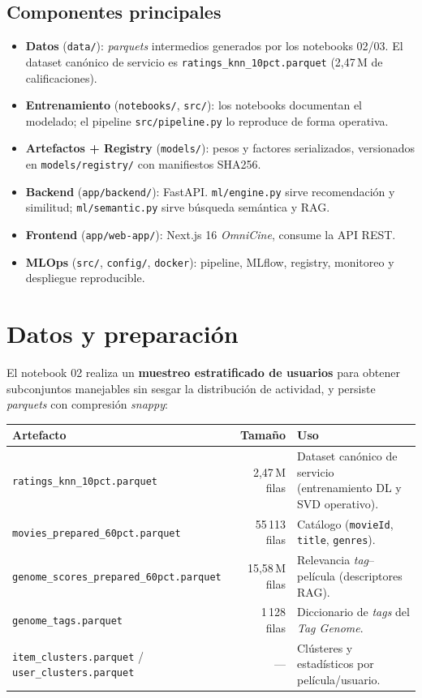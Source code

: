 \documentclass[11pt,a4paper]{article}
\newcommand{\code}[1]{\textcolor{omnidark}{\texttt{#1}}}
\begin{document}
\subsection{Componentes principales}
\begin{itemize}
\item \textbf{Datos} (\code{data/}): \textit{parquets} intermedios generados por los notebooks 02/03. El dataset canónico de servicio es \code{ratings\_knn\_10pct.parquet} (2,47\,M de calificaciones).
\item \textbf{Entrenamiento} (\code{notebooks/}, \code{src/}): los notebooks documentan el modelado; el pipeline \code{src/pipeline.py} lo reproduce de forma operativa.
\item \textbf{Artefactos + Registry} (\code{models/}): pesos y factores serializados, versionados en \code{models/registry/} con manifiestos SHA256.
\item \textbf{Backend} (\code{app/backend/}): FastAPI. \code{ml/engine.py} sirve recomendación y similitud; \code{ml/semantic.py} sirve búsqueda semántica y RAG.
\item \textbf{Frontend} (\code{app/web-app/}): Next.js 16 \textit{OmniCine}, consume la API REST.
\item \textbf{MLOps} (\code{src/}, \code{config/}, \code{docker}): pipeline, MLflow, registry, monitoreo y despliegue reproducible.
\end{itemize}

\section{Datos y preparación}
\label{sec:datos}
El notebook 02 realiza un \textbf{muestreo estratificado de usuarios} para obtener subconjuntos manejables sin sesgar la distribución de actividad, y persiste \textit{parquets} con compresión \textit{snappy}:

\begin{center}
\small
\begin{tabularx}{\textwidth}{@{}l r X@{}}
\toprule
\textbf{Artefacto} & \textbf{Tamaño} & \textbf{Uso} \\
\midrule
\code{ratings\_knn\_10pct.parquet} & 2,47\,M filas & Dataset canónico de servicio (entrenamiento DL y SVD operativo). \\
\code{movies\_prepared\_60pct.parquet} & 55\,113 filas & Catálogo (\code{movieId}, \code{title}, \code{genres}). \\
\code{genome\_scores\_prepared\_60pct.parquet} & 15,58\,M filas & Relevancia \textit{tag}--película (descriptores RAG). \\
\code{genome\_tags.parquet} & 1\,128 filas & Diccionario de \textit{tags} del \textit{Tag Genome}. \\
\code{item\_clusters.parquet} / \code{user\_clusters.parquet} & --- & Clústeres y estadísticos por película/usuario. \\
\bottomrule
\end{tabularx}
\end{center}
\end{document}
